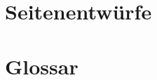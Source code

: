 \documentclass[parskip=full,11pt,twoside]{scrartcl}
\begin{document}
%
%
%

\pagebreak
\appendix

\section{Seitenentwürfe}


\section{Glossar}

\glsaddall
\printglossaries
\end{document}
